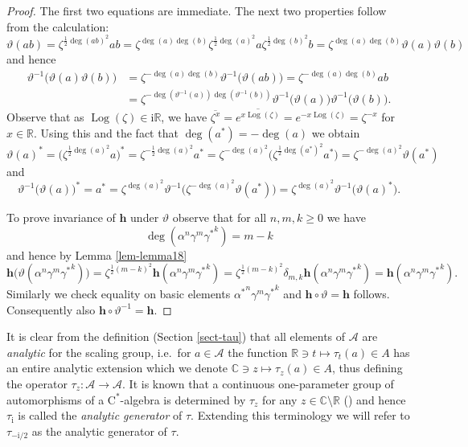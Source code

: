 \documentclass[12pt,reqno,a4paper]{amsart}
\theoremstyle{definition}
\newcommand{\cst}{\ensuremath{\mathrm{C}^*}}
\newcommand{\comp}{\circ}
\newcommand{\ii}{\mathrm{i}}
\newcommand{\CC}{\mathbb{C}}
\newcommand{\RR}{\mathbb{R}}
\newcommand{\cA}{\mathscr{A}}
\newcommand{\bh}{{\boldsymbol{h}}}
\numberwithin{equation}{section}
\begin{document}
\begin{proof}
The first two equations are immediate. The next two properties follow from the calculation:
\[
\vartheta(ab)=\zeta^{\frac{1}{2}\deg(ab)^2}ab
=\zeta^{ \deg(a)\deg(b)}
\zeta^{\frac{1}{2}\deg(a)^2}a\zeta^{\frac{1}{2}\deg(b)^2}b
=\zeta^{\deg(a)\deg(b)}\vartheta(a)\vartheta(b)
\]
and hence
\begin{align*}
\vartheta^{-1}\bigl(\vartheta(a)\vartheta(b)\bigr)
&=\zeta^{-\deg(a)\deg(b)}\vartheta^{-1}\bigl(\vartheta(ab)\bigr)
=\zeta^{-\deg(a)\deg(b)}ab\\
&=\zeta^{-\deg(\vartheta^{-1}(a))\deg(\vartheta^{-1}(b))}
\vartheta^{-1}\bigl(\vartheta(a)\bigr)
\vartheta^{-1}\bigl(\vartheta(b)\bigr).
\end{align*}
Observe that as $\operatorname{Log}(\zeta)\in \ii \RR$, we have $\overline{\zeta^{x}}=\overline{e^{x \operatorname{Log}(\zeta)}}=e^{-x \operatorname{Log}(\zeta)}=\zeta^{-x}$  for $x\in\RR$. Using this and the fact that $\deg(a^*)=-\deg(a)$ we obtain
\[
\vartheta(a)^*
=\bigl(\zeta^{\frac{1}{2}\deg(a)^2}a\bigr)^*
=\zeta^{-\frac{1}{2}\deg(a)^2}a^*
=\zeta^{-\deg(a)^2}\bigl(\zeta^{\frac{1}{2}\deg(a^*)^2}a^*\bigr)
=\zeta^{-\deg(a)^2}\vartheta(a^*)
\]
and
\[
\vartheta^{-1}\bigl(\vartheta(a)\bigr)^*
=a^*=\zeta^{\deg(a)^2}\vartheta^{-1}
\bigl(\zeta^{-\deg(a)^2}\vartheta(a^*)\bigr)
=\zeta^{\deg(a)^2}\vartheta^{-1}\bigl(\vartheta(a)^*\bigr).
\]

To prove invariance of $\bh$ under $\vartheta$ observe that for all $n,m,k\ge 0$ we have
\[
\deg(\alpha^n\gamma^m{\gamma^*}^k)=m-k
\]
and hence by Lemma \ref{lem-lemma18}
\[
\bh\bigl(\vartheta(\alpha^n \gamma^m{\gamma^*}^k)\bigr)
=\zeta^{\frac{1}{2}(m-k)^2}\bh(\alpha^n\gamma^m{\gamma^*}^k)
=\zeta^{\frac{1}{2}(m-k)^2}\delta_{m,k}\bh(\alpha^n\gamma^m{\gamma^*}^k)=\bh(\alpha^n\gamma^m{\gamma^*}^k).
\]
Similarly we check equality on basic elements ${\alpha^*}^n\gamma^m{\gamma^*}^k$ and $\bh\comp\vartheta=\bh$ follows. Consequently also $\bh\comp\vartheta^{-1}=\bh$.
\end{proof}

It is clear from the definition (Section \ref{sect-tau}) that all elements of $\cA$ are \emph{analytic} for the scaling group, i.e.~for $a\in\cA$ the function $\RR\ni t\mapsto\tau_t(a)\in A$ has an entire analytic extension which we denote $\CC\ni z\mapsto\tau_z(a)\in A$, thus defining the operator $\tau_z\colon\cA\to\cA$. It is known that a continuous one-parameter group of automorphisms of a \cst-algebra is determined by $\tau_z$ for any $z\in\CC\setminus\RR$ (\cite{CioranescuZsido}) and hence $\tau_\ii$ is called the \emph{analytic generator} of $\tau$. Extending this terminology we will refer to $\tau_{-\ii/2}$ as the analytic generator of $\tau$.
\end{document}
